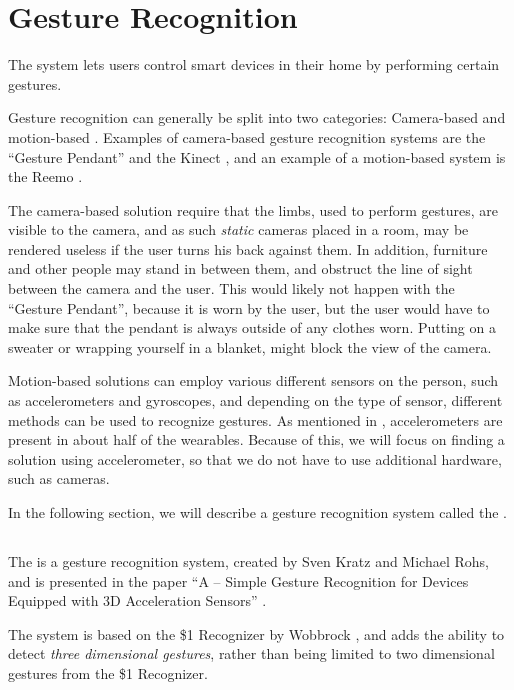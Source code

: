 \section{Gesture Recognition}\label{sec:gesturerecognition}
The system lets users control smart devices in their home by performing certain gestures.

Gesture recognition can generally be split into two categories: 
Camera-based and motion-based \cite{Kela2006}. 
Examples of camera-based gesture recognition systems are the ``Gesture Pendant'' \cite{starner2000gesture} and the Kinect \cite{kinect}, 
and an example of a motion-based system is the Reemo \cite{Reemo}.

The camera-based solution require that the limbs, 
used to perform gestures, 
are visible to the camera, 
and as such \emph{static} cameras placed in a room, 
may be rendered useless if the user turns his back against them. 
In addition, furniture and other people may stand in between them, 
and obstruct the line of sight between the camera and the user.
This would likely not happen with the ``Gesture Pendant'',
because it is worn by the user, 
but the user would have to make sure that the pendant is always outside of any clothes worn.
Putting on a sweater or wrapping yourself in a blanket, 
might block the view of the camera.

Motion-based solutions can employ various different sensors on the person,
such as accelerometers and gyroscopes, 
and depending on the type of sensor, 
different methods can be used to recognize gestures.
As mentioned in , accelerometers are present in about half of the wearables. 
Because of this, we will focus on finding a solution using accelerometer, 
so that we do not have to use additional hardware, such as cameras. 

In the following section, we will describe a gesture recognition system called the \threedollar. 

\subsection{\threedollar}\label{sec:threedollar}
The \threedollar is a gesture recognition system, 
created by Sven Kratz and Michael Rohs, 
and is presented in the paper ``A \threedollar – Simple Gesture Recognition for Devices Equipped with 3D Acceleration Sensors'' \cite{threedollar}.

The system is based on the \$1 Recognizer by Wobbrock \etal \cite{wobbrock2007gestures}, 
and adds the ability to detect \emph{three dimensional gestures}, 
rather than being limited to two dimensional gestures from the \$1 Recognizer.

